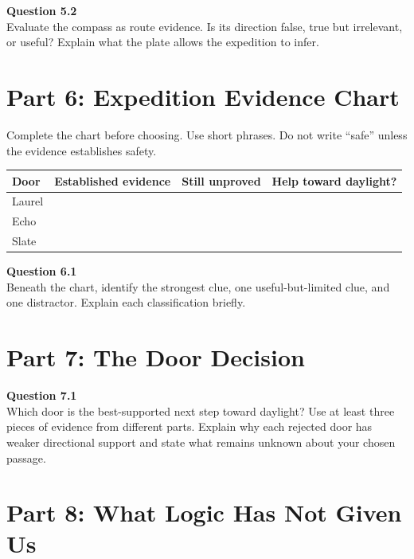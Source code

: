 \documentclass[12pt]{article}
\begin{document}
\textbf{Question 5.2}\\[-0.15em]
Evaluate the compass as route evidence. Is its direction false, true but irrelevant, or useful? Explain what the plate allows the expedition to infer.


\newpage

\section*{Part 6: Expedition Evidence Chart}

Complete the chart before choosing. Use short phrases. Do not write ``safe'' unless the evidence establishes safety.

\renewcommand{\arraystretch}{1.5}
\begin{tabular}{|p{}|p{}|p{}|p{}|}
\hline
\textbf{Door} & \textbf{Established evidence} & \textbf{Still unproved} & \textbf{Help toward daylight?}\\ \hline
Laurel & & & \\[0.52in] \hline
Echo & & & \\[0.52in] \hline
Slate & & & \\[0.52in] \hline
\end{tabular}

\vspace{0.35em}
\textbf{Question 6.1}\\[-0.15em]
Beneath the chart, identify the strongest clue, one useful-but-limited clue, and one distractor. Explain each classification briefly.


\newpage

\section*{Part 7: The Door Decision}

\textbf{Question 7.1}\\[-0.15em]
Which door is the best-supported next step toward daylight? Use at least three pieces of evidence from different parts. Explain why each rejected door has weaker directional support and state what remains unknown about your chosen passage.


\newpage

\section*{Part 8: What Logic Has Not Given Us}
\end{document}
